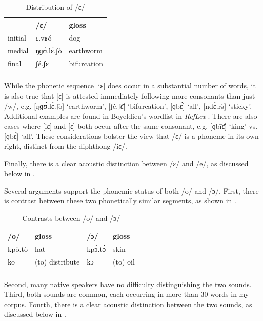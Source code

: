 \documentclass[output=paper,colorlinks,citecolor=brown]{langscibook}
\begin{document}
\begin{table}
\caption{Distribution of /ɛ/}
\label{tab:olson:5}
    \begin{tabular}{lll}
    \lsptoprule
                    & /ɛ/ & gloss\\
    \midrule
        initial     & ɛ̄.vʁó & dog\\
        medial      & ŋɡʊ́.lɛ̀.ʃò  & earthworm\\
        final       & ʃé.ʃɛ̄   & bifurcation\\
    \lspbottomrule
 \end{tabular}
\end{table}

While the phonetic sequence [iɛ] does occur in a substantial number of words, it is also true that [ɛ] is attested immediately following more consonants than just /w/, e.g. [ŋɡʊ́.lɛ̀.ʃò] ‘earthworm’, [ʃé.ʃɛ̄] ‘bifurcation’, [ɡbɛ́] ‘all’, [ndɛ̀.rə̀] ‘sticky’. Additional examples are found in Boyeldieu's  wordlist in \textit{RefLex} \citep{SegererFlavier2011}. There are also cases where [iɛ] and [ɛ] both occur after the same consonant, e.g. [ɡbīɛ̄] ‘king’ vs. [ɡbɛ́] ‘all’. These considerations bolster the view that /ɛ/ is a phoneme in its own right, distinct from the diphthong /iɛ/.

Finally, there is a clear acoustic distinction between /ɛ/ and /e/, as discussed below in .

Several arguments support the phonemic status of both /o/ and /ɔ/. First, there is contrast between these two phonetically similar segments, as shown in .

\begin{table}
\caption{Contrasts between /o/ and /ɔ/ \citep[9]{Théret-Kieschke1998}}
\label{tab:olson:6}
    \begin{tabular}{llll}
    \lsptoprule
        /o/ & gloss & /ɔ/  & gloss\\
    \midrule
        kpò.tò & hat & kpɔ̀.tɔ̀ & skin\\
        ko  & (to) distribute  & kɔ & (to) oil\\
    \lspbottomrule
    \end{tabular}
\end{table}

Second, many native speakers have no difficulty distinguishing the two sounds. Third, both sounds are common, each occurring in more than 30 words in my corpus. Fourth, there is a clear acoustic distinction between the two sounds, as discussed below in .
\end{document}
